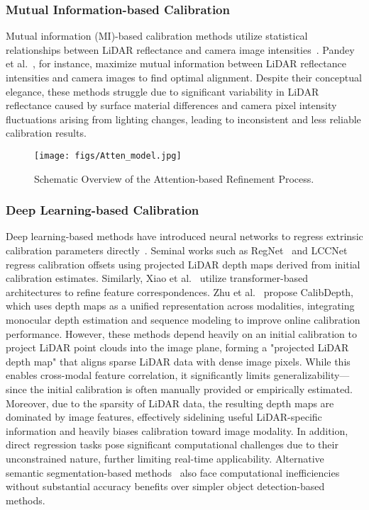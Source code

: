 \subsubsection{Mutual Information-based Calibration}
Mutual information (MI)-based calibration methods utilize statistical relationships between LiDAR reflectance and camera image intensities~\cite{pandey2012automatic,taylor2013automatic}. Pandey et al.~\cite{pandey2012automatic}, for instance, maximize mutual information between LiDAR reflectance intensities and camera images to find optimal alignment. Despite their conceptual elegance, these methods struggle due to significant variability in LiDAR reflectance caused by surface material differences and camera pixel intensity fluctuations arising from lighting changes, leading to inconsistent and less reliable calibration results.
\begin{figure}[]
	\centering
	\texttt{[image: figs/Atten\_model.jpg]}
	\caption{Schematic Overview of the Attention-based Refinement Process.}
	\label{Atten_model}
\end{figure}
\subsubsection{Deep Learning-based Calibration}
Deep learning-based methods have introduced neural networks to regress extrinsic calibration parameters directly~\cite{schneider2017regnet,lv2021lccnet,xiao2024calibformer,shi2020calibrcnn,zhu2023calibdepth}. Seminal works such as RegNet~\cite{schneider2017regnet} and LCCNet~\cite{lv2021lccnet} regress calibration offsets using projected LiDAR depth maps derived from initial calibration estimates. Similarly, Xiao et al.~\cite{xiao2024calibformer} utilize transformer-based architectures to refine feature correspondences. Zhu et al.~\cite{zhu2023calibdepth} propose CalibDepth, which uses depth maps as a unified representation across modalities, integrating monocular depth estimation and sequence modeling to improve online calibration performance. However, these methods depend heavily on an initial calibration to project LiDAR point clouds into the image plane, forming a "projected LiDAR depth map" that aligns sparse LiDAR data with dense image pixels. While this enables cross-modal feature correlation, it significantly limits generalizability—since the initial calibration is often manually provided or empirically estimated. Moreover, due to the sparsity of LiDAR data, the resulting depth maps are dominated by image features, effectively sidelining useful LiDAR-specific information and heavily biases calibration toward image modality. In addition, direct regression tasks pose significant computational challenges due to their unconstrained nature, further limiting real-time applicability. Alternative semantic segmentation-based methods~\cite{luo2024zero} also face computational inefficiencies without substantial accuracy benefits over simpler object detection-based methods.



